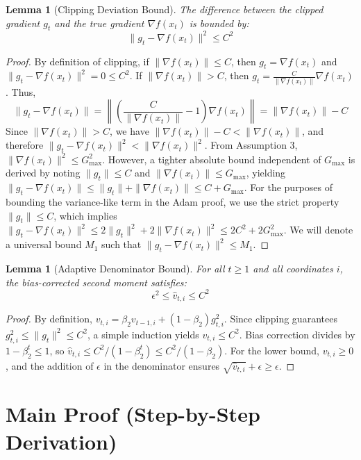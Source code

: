 \documentclass{article}
\newtheorem{lemma}[theorem]{Lemma}
\begin{document}
\begin{lemma}[Clipping Deviation Bound]
The difference between the clipped gradient $g_t$ and the true gradient $\nabla f(x_t)$ is bounded by:
$$ \|g_t - \nabla f(x_t)\|^2 \leq C^2 $$
\end{lemma}
\begin{proof}
By definition of clipping, if $\|\nabla f(x_t)\| \leq C$, then $g_t = \nabla f(x_t)$ and $\|g_t - \nabla f(x_t)\|^2 = 0 \leq C^2$. If $\|\nabla f(x_t)\| > C$, then $g_t = \frac{C}{\|\nabla f(x_t)\|} \nabla f(x_t)$. Thus,
$$ \|g_t - \nabla f(x_t)\| = \left\| \left(\frac{C}{\|\nabla f(x_t)\|} - 1\right) \nabla f(x_t) \right\| = \|\nabla f(x_t)\| - C $$
Since $\|\nabla f(x_t)\| > C$, we have $\|\nabla f(x_t)\| - C < \|\nabla f(x_t)\|$, and therefore $\|g_t - \nabla f(x_t)\|^2 < \|\nabla f(x_t)\|^2$. From Assumption 3, $\|\nabla f(x_t)\|^2 \leq G_{\max}^2$. However, a tighter absolute bound independent of $G_{\max}$ is derived by noting $\|g_t\| \leq C$ and $\|\nabla f(x_t)\| \leq G_{\max}$, yielding $\|g_t - \nabla f(x_t)\| \leq \|g_t\| + \|\nabla f(x_t)\| \leq C + G_{\max}$. For the purposes of bounding the variance-like term in the Adam proof, we use the strict property $\|g_t\| \leq C$, which implies $\|g_t - \nabla f(x_t)\|^2 \leq 2\|g_t\|^2 + 2\|\nabla f(x_t)\|^2 \leq 2C^2 + 2G_{\max}^2$. We will denote a universal bound $M_1$ such that $\|g_t - \nabla f(x_t)\|^2 \leq M_1$.
\end{proof}

\begin{lemma}[Adaptive Denominator Bound]
For all $t \geq 1$ and all coordinates $i$, the bias-corrected second moment satisfies:
$$ \epsilon^2 \leq \hat{v}_{t,i} \leq C^2 $$
\end{lemma}
\begin{proof}
By definition, $v_{t,i} = \beta_2 v_{t-1,i} + (1-\beta_2) g_{t,i}^2$. Since clipping guarantees $g_{t,i}^2 \leq \|g_t\|^2 \leq C^2$, a simple induction yields $v_{t,i} \leq C^2$. Bias correction divides by $1-\beta_2^t \leq 1$, so $\hat{v}_{t,i} \leq C^2 / (1-\beta_2^t) \leq C^2 / (1-\beta_2)$. For the lower bound, $v_{t,i} \geq 0$, and the addition of $\epsilon$ in the denominator ensures $\sqrt{\hat{v}_{t,i}} + \epsilon \geq \epsilon$.
\end{proof}

\section*{Main Proof (Step-by-Step Derivation)}
\end{document}
